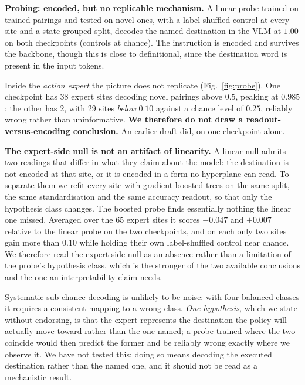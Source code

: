 \documentclass{article}
\begin{document}
\textbf{Probing: encoded, but no replicable mechanism.} A linear probe trained on trained
pairings and tested on novel ones, with a label-shuffled control at every site and a
state-grouped split, decodes the named destination in the VLM at $1.00$ on both checkpoints
(controls at chance). The instruction is encoded and survives the backbone, though this is
close to definitional, since the destination word is present in the input tokens.

Inside the \emph{action expert} the picture does not replicate (Fig.~\ref{fig:probe}). One
checkpoint has 38 expert sites decoding novel pairings above $0.5$, peaking at $0.985$; the
other has 2, with 29 sites \emph{below} $0.10$ against a chance level of $0.25$, reliably
wrong rather than uninformative. \textbf{We therefore do not draw a readout-versus-encoding
conclusion.} An earlier draft did, on one checkpoint alone.

\textbf{The expert-side null is not an artifact of linearity.} A linear null admits two
readings that differ in what they claim about the model: the destination is not encoded at
that site, or it is encoded in a form no hyperplane can read. To separate them we refit every
site with gradient-boosted trees on the same split, the same standardisation and the same
accuracy readout, so that only the hypothesis class changes. The boosted probe finds
essentially nothing the linear one missed. Averaged over the $65$ expert sites it scores
$-0.047$ and $+0.007$ relative to the linear probe on the two checkpoints, and on each only
two sites gain more than $0.10$ while holding their own label-shuffled control near chance.
We therefore read the expert-side null as an absence rather than a limitation of the probe's
hypothesis class, which is the stronger of the two available conclusions and the one an
interpretability claim needs.

Systematic sub-chance decoding is unlikely to be noise: with four balanced classes it requires
a consistent mapping to a wrong class. \emph{One hypothesis}, which we state without endorsing,
is that the expert represents the destination the policy will actually move toward rather than
the one named; a probe trained where the two coincide would then predict the former and be
reliably wrong exactly where we observe it. We have not tested this; doing so means decoding
the executed destination rather than the named one, and it should not be read as a mechanistic
result.
\end{document}
